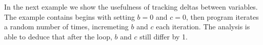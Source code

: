 In the next example we show the usefulness of tracking deltas between
variables. The example contains begins with setting $b=0$ and $c=0$,
then program iterates a random number of times, incremeting $b$ and $c$
each iteration. The analysis is able to deduce that after the loop, $b$
and $c$ still differ by 1.
